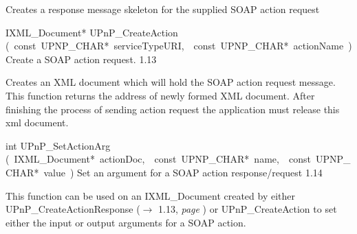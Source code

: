 \documentclass{article}
\begin{document}
\begin{cxxentry}
\begin{cxxfunction}
\begin{cxxdoc}
Creates a response message skeleton for the supplied SOAP action request


\end{cxxdoc}
\end{cxxfunction}
\begin{cxxfunction}
{IXML\_Document*}
        {UPnP\_CreateAction}
        {(\ const\ UPNP\_CHAR*\ serviceTypeURI,\ \ const\ UPNP\_CHAR*\ actionName\ )}
        {Create a SOAP action request. }
        {1.13}
\begin{cxxdoc}

Creates an XML document which will hold the SOAP action request
message. This function returns the address of newly formed XML document.
After finishing the process of sending action request the application
must release this xml document.


\end{cxxdoc}
\end{cxxfunction}
\begin{cxxfunction}
{int}
        {UPnP\_SetActionArg}
        {(\ IXML\_Document*\ actionDoc,\ \ const\ UPNP\_CHAR*\ name,\ \ const\ UPNP\_CHAR*\ value\ )}
        {Set an argument for a SOAP action response/request }
        {1.14}
\begin{cxxdoc}

This function can be used on an IXML\_Document created by either
UPnP\_CreateActionResponse ($\rightarrow$ 1.13, {\em page }\pageref{cxx.1.13}) or UPnP\_CreateAction to set
either the input or output arguments for a SOAP action.



\end{cxxdoc}
\end{cxxfunction}
\end{cxxentry}
\end{document}
